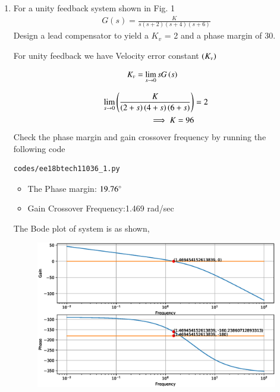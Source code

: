 \begin{enumerate}[label=\thesection.\arabic*.,ref=\thesection.\theenumi]

\item For a unity feedback system shown in Fig. 1
\begin{align}
G(s) =\frac{K}{s(s+2)(s+4)(s+6)}
\label{eq:ee18btech11036_system1}
\end{align}
Design a lead compensator to yield a $K_v$ = 2 and a phase margin of 30\degree.
\begin{figure}[!ht]
	\centering
	\resizebox{\columnwidth}{!}{}
\caption{}
\label{fig:ee18btech11036}
\end{figure}

\solution 
For unity feedback we have Velocity error constant $\left(K_v\right)$

\begin{align}
K_v &= \lim_{s \to 0} s G\brak{s} 
\label{eq:ee18btech11036_Kv}
\end{align}

\begin{align}
\lim_{s \to 0} \brak{\frac{K}{\brak{2+s}\brak{4+s}\brak{6+s}} }& = 2 
\\
\implies K = 96
\label{eq:ee18btech11036_init_cond}
\end{align}
Check the phase margin and gain crossover frequency by running the following code
\begin{lstlisting}
codes/ee18btech11036_1.py
\end{lstlisting}
\begin{itemize}
    \item The Phase margin: $19.76\degree$
    \item Gain Crossover Frequency:1.469  rad/sec
\end{itemize}
The Bode plot of system is as shown,
\begin{figure}[!ht]
  \centering
  \includegraphics[width=\columnwidth]{./figs/ee18btech11036_1.eps}
  \caption{}
  \label{fig:ee18btech11036_1}
\end{figure}


\end{enumerate}
